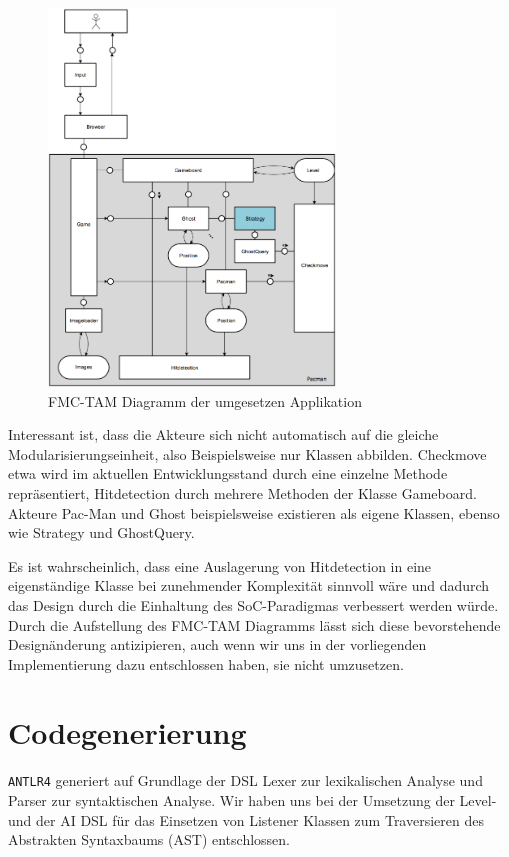 \documentclass[conference]{IEEEtran}
\begin{document}
\begin{figure}[!t]
\centering
\includegraphics[width=3.0in]{tam.png}

\caption{FMC-TAM Diagramm der umgesetzen Applikation}
\label{fmc_tam}
\end{figure}

Interessant ist, dass die Akteure sich nicht automatisch auf die gleiche Modularisierungseinheit, also Beispielsweise nur  Klassen abbilden. Checkmove etwa wird im aktuellen Entwicklungsstand durch eine einzelne Methode repräsentiert, Hitdetection durch mehrere Methoden der Klasse Gameboard. Akteure Pac-Man und Ghost beispielsweise existieren als eigene Klassen, ebenso wie Strategy und GhostQuery.

Es ist wahrscheinlich, dass eine Auslagerung von Hitdetection in eine eigenständige Klasse bei zunehmender Komplexität sinnvoll wäre und dadurch das Design durch die Einhaltung des SoC-Paradigmas verbessert werden würde. Durch die Aufstellung des FMC-TAM Diagramms lässt sich diese bevorstehende Designänderung antizipieren, auch wenn wir uns in der vorliegenden Implementierung dazu entschlossen haben, sie nicht umzusetzen.

\section{Codegenerierung}
\texttt{ANTLR4} generiert auf Grundlage der DSL Lexer zur lexikalischen Analyse und Parser zur syntaktischen Analyse.
Wir haben uns bei der Umsetzung der Level- und der AI DSL für  das Einsetzen von Listener Klassen zum Traversieren des Abstrakten Syntaxbaums (AST) entschlossen.
\end{document}
